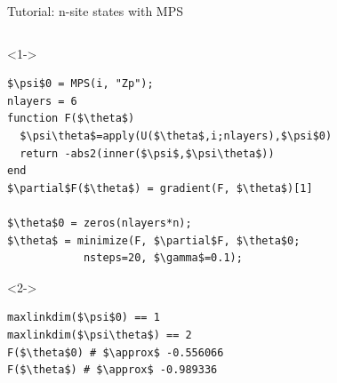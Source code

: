 \begin{frame}[fragile]{Tutorial: n-site states with MPS}

\begin{columns}

\begin{column}{5.5cm}

\begin{onlyenv}<1->
\begin{lstlisting}[language=JuliaLocal, style=julia, mathescape, basicstyle=\scriptsize\ttfamily]
$\psi$0 = MPS(i, "Zp");
nlayers = 6
function F($\theta$)
  $\psi\theta$=apply(U($\theta$,i;nlayers),$\psi$0)
  return -abs2(inner($\psi$,$\psi\theta$))
end
$\partial$F($\theta$) = gradient(F, $\theta$)[1]

$\theta$0 = zeros(nlayers*n);
$\theta$ = minimize(F, $\partial$F, $\theta$0;
            nsteps=20, $\gamma$=0.1);
\end{lstlisting}
\end{onlyenv}


\begin{onlyenv}<2->
\begin{lstlisting}[language=JuliaLocal, style=julia, mathescape, basicstyle=\scriptsize\ttfamily]
maxlinkdim($\psi$0) == 1
maxlinkdim($\psi\theta$) == 2
F($\theta$0) # $\approx$ -0.556066
F($\theta$) # $\approx$ -0.989336
\end{lstlisting}
\end{onlyenv}

\end{column}

\begin{column}{4.5cm}



\end{column}
\end{columns}
\end{frame}
